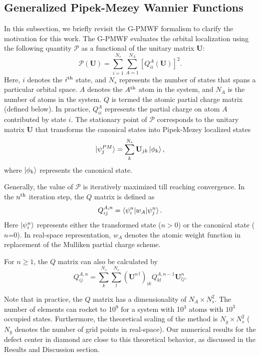 \documentclass[journal=jacsat,manuscript=article]{achemso}
\begin{document}
\subsection{Generalized Pipek-Mezey Wannier Functions}
In this subsection, we briefly revisit the G-PMWF formalism\cite{Jonsson2017} to clarify the motivation for this work.
The G-PMWF evaluates the orbital localization using the following quantity $\mathcal{P}$ as a functional of the unitary matrix $\textbf{U}$:
\begin{equation}\label{eq:p}
\mathcal{P(\textbf{U})} = \sum_{i=1}^{N_{s}} \sum_{A=1}^{N_A} [Q_{ii}^A(\textbf{U})]^2.
\end{equation}
Here, $i$ denotes the $i^{\rm th}$ state, and $N_{s}$ represents the number of states that spans a particular orbital space. $A$ denotes the $A^{\rm th}$ atom in the system, and $N_A$ is the number of atoms in the system. $Q$ is termed the atomic partial charge matrix (defined below). In practice, $Q_{ii}^A$ represents the partial charge on atom $A$ contributed by state $i$. The stationary point of $\mathcal{P}$ corresponds to the unitary matrix $\textbf{U}$ that transforms the canonical states into Pipek-Mezey localized states
\begin{equation}\label{eqn:pmwf}
\ket{\psi^{PM}_j} = \sum_k^{N_{s}} \textbf{U}_{jk} \ket{\phi_k},
\end{equation}
where $\ket{\phi_k}$ represents the canonical state.

Generally, the value of $\mathcal{P}$ is iteratively maximized till reaching convergence. In the $n^{\rm th}$ iteration step, the $Q$ matrix is defined as
\begin{equation}\label{eq:apcm}
Q^{A,n}_{ij} = \braket{\psi_i^{n}|w_A|\psi_j^{n}}.
\end{equation}
Here $\ket{\psi_i^n}$ represents either the transformed state ($n>$0) or the canonical state ($n$=0). In real-space representation, $w_A$ denotes the atomic weight function\cite{Hirshfeld1977,Cioslowski1991,bader1994,Alcoba2006,Timothy2008,Timothy2009,Knizia2013,Janowski2014,Lehtola2014,Knizia2015} in replacement of the Mulliken partial charge scheme\cite{Pipek1989}.

For $n\ge1$, the $Q$ matrix can also be calculated by
\begin{equation}\label{eq:apcm2}
Q^{A,n}_{ij} = \sum_k^{N_{s}} \sum_l^{N_{s}} ({\textbf{U}^{n}}^{\dagger})_{ik} Q^{A,n-1}_{kl} \textbf{U}^{n}_{lj}.
\end{equation}

Note that in practice, the $Q$ matrix has a dimensionality of $N_A\times N_{s}^2$. The number of elements can rocket to 10$^9$ for a system with 10$^3$ atoms with $10^3$ occupied states. Furthermore, the theoretical scaling of the method is $N_{g}\times N_{s}^2$ ($N_{g}$ denotes the number of grid points in real-space). Our numerical results for the defect center in diamond are close to this theoretical behavior, as discussed in the Results and Discussion section.
\end{document}
